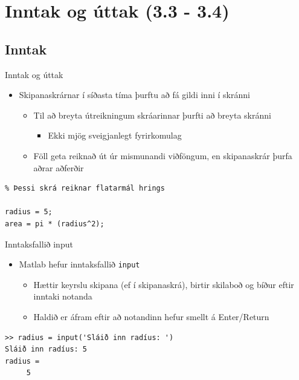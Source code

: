 \documentclass{beamer}
\begin{document}
\section{Inntak og úttak (3.3 - 3.4)}

\subsection{Inntak}

\begin{frame}[fragile]{Inntak og úttak}
\begin{itemize}
 \item Skipanaskrárnar í síðasta tíma þurftu að fá gildi inni í skránni
 \begin{itemize}
  \item Til að breyta útreikningum skráarinnar þurfti að breyta skránni
  \begin{itemize}
   \item Ekki mjög sveigjanlegt fyrirkomulag
  \end{itemize}
  \item Föll geta reiknað út úr mismunandi viðföngum, en skipanaskrár þurfa aðrar aðferðir
 \end{itemize}
\end{itemize}
\begin{verbatim}
% Þessi skrá reiknar flatarmál hrings

radius = 5;
area = pi * (radius^2);
\end{verbatim}
\end{frame}

\begin{frame}[fragile]{Inntaksfallið input}
\begin{itemize}
 \item Matlab hefur inntaksfallið \texttt{input}
 \begin{itemize}
  \item Hættir keyrslu skipana (ef í skipanaskrá), birtir skilaboð og bíður eftir inntaki notanda
  \item Haldið er áfram eftir að notandinn hefur smellt á Enter/Return
 \end{itemize}
\end{itemize}

\begin{verbatim}
>> radius = input('Sláið inn radíus: ')
Sláið inn radíus: 5
radius =
     5
\end{verbatim}
\end{frame}
\end{document}
